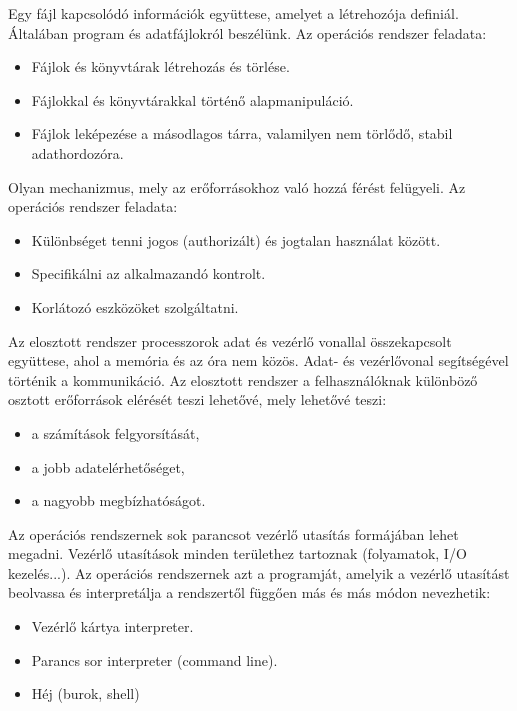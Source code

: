 \begin{description}[nosep]
\item[Fájlkezelés]
Egy fájl kapcsolódó információk együttese, amelyet a létrehozója definiál. Általában program és adatfájlokról beszélünk.
Az operációs rendszer feladata:
\begin{itemize}[nosep]
	\item Fájlok és könyvtárak létrehozás és törlése.
	\item Fájlokkal és könyvtárakkal történő alapmanipuláció.
	\item Fájlok leképezése a másodlagos tárra, valamilyen nem törlődő, stabil adathordozóra.
\end{itemize}
\item[Védelmi rendszer]
Olyan mechanizmus, mely az erőforrásokhoz való hozzá férést felügyeli. Az operációs rendszer feladata:
\begin{itemize}[nosep]
	\item Különbséget tenni jogos (authorizált) és jogtalan használat között.
	\item Specifikálni az alkalmazandó kontrolt.
	\item Korlátozó eszközöket szolgáltatni.
\end{itemize}
\item[Hálózat elérés támogatása]
Az elosztott rendszer processzorok adat és vezérlő vonallal összekapcsolt együttese, ahol a memória és az óra nem közös. Adat- és vezérlővonal segítségével történik a kommunikáció. Az elosztott rendszer a felhasználóknak különböző osztott erőforrások elérését teszi lehetővé, mely lehetővé teszi:
\begin{itemize}[nosep]
	\item a számítások felgyorsítását,
	\item a jobb adatelérhetőséget,
	\item a nagyobb megbízhatóságot.
\end{itemize}
\item[Parancs interpreter alrendszer]
Az operációs rendszernek sok parancsot vezérlő utasítás formájában lehet megadni. Vezérlő utasítások minden területhez tartoznak (folyamatok, I/O kezelés...). Az operációs rendszernek azt a programját, amelyik a vezérlő utasítást beolvassa és interpretálja a rendszertől függően más és más módon nevezhetik:
\begin{itemize}[nosep]
	\item Vezérlő kártya interpreter.
	\item Parancs sor interpreter (command line).
	\item Héj (burok, shell)
\end{itemize}
\end{description}


